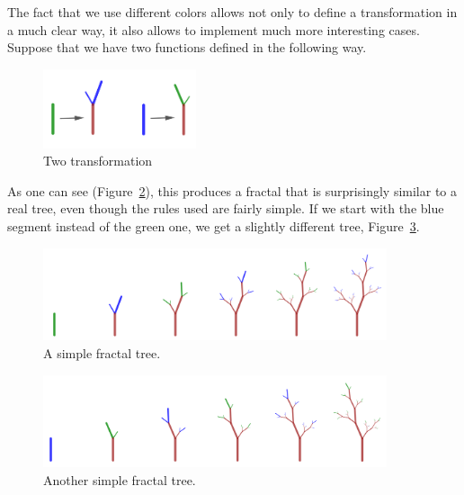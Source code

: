         The fact that we use different colors allows not only to define a transformation in a much clear way, it also allows to implement much more interesting cases.
        Suppose that we have two functions defined in the following way.

        \begin{figure}[ht]
            \caption{\label{med02} Two transformation}
            \centering
            \includegraphics[width=0.4\textwidth]{img/med02.png}
        \end{figure}

        \FloatBarrier

        As one can see (Figure~\ref{med03}), this produces a fractal that is surprisingly similar to a real tree, even though the rules used are fairly simple.
        If we start with the blue segment instead of the green one, we get a slightly different tree, Figure~\ref{med04}.

        \begin{figure}[ht]
            \caption{\label{med03} A simple fractal tree.}
            \centering
            \includegraphics[width=0.9\textwidth]{img/med03.png}
        \end{figure}

        \begin{figure}[ht]
            \caption{\label{med04} Another simple fractal tree.}
            \centering
            \includegraphics[width=0.9\textwidth]{img/med04.png}
        \end{figure}

